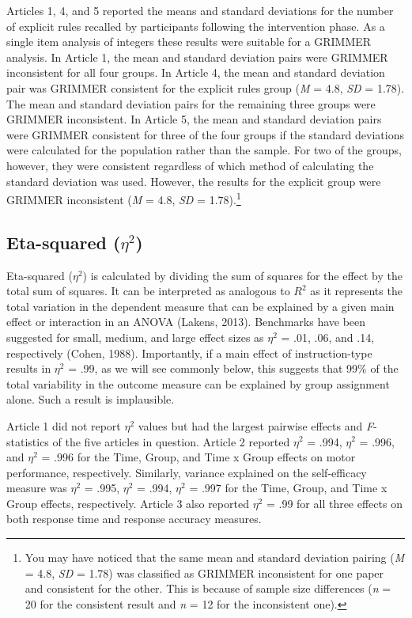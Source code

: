 \documentclass[
  english,
  man,floatsintext]{apa7}
\begin{document}
Articles 1, 4, and 5 reported the means and standard deviations for the number of explicit rules recalled by participants following the intervention phase. As a single item analysis of integers these results were suitable for a GRIMMER analysis. In Article 1, the mean and standard deviation pairs were GRIMMER inconsistent for all four groups. In Article 4, the mean and standard deviation pair was GRIMMER consistent for the explicit rules group (\emph{M} = 4.8, \emph{SD} = 1.78). The mean and standard deviation pairs for the remaining three groups were GRIMMER inconsistent. In Article 5, the mean and standard deviation pairs were GRIMMER consistent for three of the four groups if the standard deviations were calculated for the population rather than the sample. For two of the groups, however, they were consistent regardless of which method of calculating the standard deviation was used. However, the results for the explicit group were GRIMMER inconsistent (\emph{M} = 4.8, \emph{SD} = 1.78).\footnote{You may have noticed that the same mean and standard deviation pairing (\emph{M} = 4.8, \emph{SD} = 1.78) was classified as GRIMMER inconsistent for one paper and consistent for the other. This is because of sample size differences (\emph{n} = 20 for the consistent result and \emph{n} = 12 for the inconsistent one).}

\hypertarget{eta-squared-eta2-1}{%
\subsection{\texorpdfstring{Eta-squared (\(\eta^{2}\))}{Eta-squared (\textbackslash eta\^{}\{2\})}}\label{eta-squared-eta2-1}}

Eta-squared (\(\eta^{2}\)) is calculated by dividing the sum of squares for the effect by the total sum of squares. It can be interpreted as analogous to \(R^{2}\) as it represents the total variation in the dependent measure that can be explained by a given main effect or interaction in an ANOVA (Lakens, 2013). Benchmarks have been suggested for small, medium, and large effect sizes as \(\eta^{2}\) = .01, .06, and .14, respectively (Cohen, 1988). Importantly, if a main effect of instruction-type results in \(\eta^{2}\) = .99, as we will see commonly below, this suggests that 99\% of the total variability in the outcome measure can be explained by group assignment alone. Such a result is implausible.

Article 1 did not report \(\eta^{2}\) values but had the largest pairwise effects and \emph{F}-statistics of the five articles in question. Article 2 reported \(\eta^{2}\) = .994, \(\eta^{2}\) = .996, and \(\eta^{2}\) = .996 for the Time, Group, and Time x Group effects on motor performance, respectively. Similarly, variance explained on the self-efficacy measure was \(\eta^{2}\) = .995, \(\eta^{2}\) = .994, \(\eta^{2}\) = .997 for the Time, Group, and Time x Group effects, respectively. Article 3 also reported \(\eta^{2}\) = .99 for all three effects on both response time and response accuracy measures.
\end{document}
